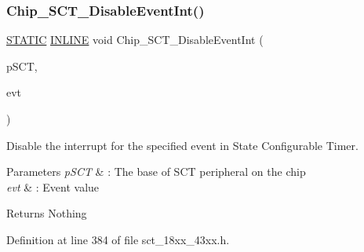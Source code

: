 \subsubsection{\texorpdfstring{Chip\+\_\+\+S\+C\+T\+\_\+\+Disable\+Event\+Int()}{Chip\_SCT\_DisableEventInt()}}
{\footnotesize\ttfamily \hyperlink{group___l_p_c___types___public___macros_ga10b2d890d871e1489bb02b7e70d9bdfb}{S\+T\+A\+T\+IC} \hyperlink{spifi__18xx__43xx_8h_a2eb6f9e0395b47b8d5e3eeae4fe0c116}{I\+N\+L\+I\+NE} void Chip\+\_\+\+S\+C\+T\+\_\+\+Disable\+Event\+Int (\begin{DoxyParamCaption}\item[{\hyperlink{struct_l_p_c___s_c_t___t}{L\+P\+C\+\_\+\+S\+C\+T\+\_\+T} $\ast$}]{p\+S\+CT,  }\item[{\hyperlink{group___s_c_t__18_x_x__43_x_x_ga9c76365e19f53e676f05cb7ccec143f7}{C\+H\+I\+P\+\_\+\+S\+C\+T\+\_\+\+E\+V\+E\+N\+T\+\_\+T}}]{evt }\end{DoxyParamCaption})}



Disable the interrupt for the specified event in State Configurable Timer. 


\begin{DoxyParams}{Parameters}
{\em p\+S\+CT} & \+: The base of S\+CT peripheral on the chip \\
\hline
{\em evt} & \+: Event value \\
\hline
\end{DoxyParams}
\begin{DoxyReturn}{Returns}
Nothing 
\end{DoxyReturn}


Definition at line 384 of file sct\+\_\+18xx\+\_\+43xx.\+h.

\mbox{\label{group___s_c_t__18_x_x__43_x_x_ga308d79c49dff3ce0d15969e95ffbd78f}} 

